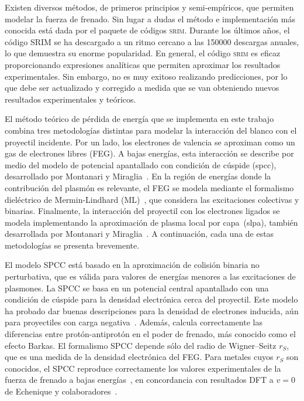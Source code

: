 Existen diversos métodos, de primeros principios y semi-empíricos, que 
permiten modelar la fuerza de frenado. Sin lugar a dudas el método e
implementación más conocida está dada por el paquete de códigos 
\textsc{srim}.
Durante los últimos años, el código SRIM se ha descargado a un ritmo 
cercano a las 150000 descargas anuales, lo que demuestra su enorme 
popularidad. En general, el código \textsc{srim} es eficaz 
proporcionando expresiones analíticas que permiten aproximar los 
resultados experimentales. Sin embargo, no es muy exitoso realizando 
predicciones, por lo que debe ser actualizado y corregido a medida que 
se van obteniendo nuevos resultados experimentales y teóricos. 

El método teórico de pérdida de energía que se implementa en este 
trabajo combina tres metodologías distintas para modelar la interacción 
del blanco con el proyectil incidente. Por un lado, los electrones de 
valencia se aproximan como un gas de electrones libres (FEG). A bajas 
energías, esta interacción se describe por medio del modelo de potencial 
apantallado con condición de cúspide (\acs{spcc}), desarrollado por 
Montanari y Miraglia~\cite{Montanari:17}. En la región de energías donde 
la contribución del plasmón es relevante, el FEG se modela mediante el 
formalismo dieléctrico de Mermin-Lindhard (ML)~\cite{Mermin:70}, que 
considera las excitaciones colectivas y binarias. Finalmente, la 
interacción del proyectil con los electrones ligados se modela 
implementando la aproximación de plasma local por capa~(\acs{slpa}), 
también desarrollada por Montanari y 
Miraglia~\cite{Montanari:17,Montanari:13}. A continuación, cada una de 
estas metodologías se presenta brevemente.

El modelo SPCC está basado en la aproximación de colisión binaria no 
perturbativa, que es válida para valores de energías menores a las 
excitaciones de plasmones. La SPCC se basa en un potencial central 
apantallado con una condición de cúspide para la densidad electrónica 
cerca del proyectil. Este modelo ha probado dar buenas descripciones 
para la densidad de electrones inducida, aún para proyectiles con carga 
negativa~\cite{Montanari:17}. Además, calcula correctamente las 
diferencias entre protón-antiprotón en el poder de frenado, más 
conocido como el efecto Barkas. El formalismo SPCC depende sólo del 
radio de Wigner--Seitz $r_S$, que es una medida de la densidad 
electrónica del FEG. Para metales cuyos $r_S$ son conocidos, el SPCC 
reproduce correctamente los valores experimentales de la fuerza de 
frenado a bajas energías~\cite{Montanari:17}, en concordancia con 
resultados DFT a $v=0$ de Echenique y colaboradores~\cite{Echenique:81,
Nagy:89}.

